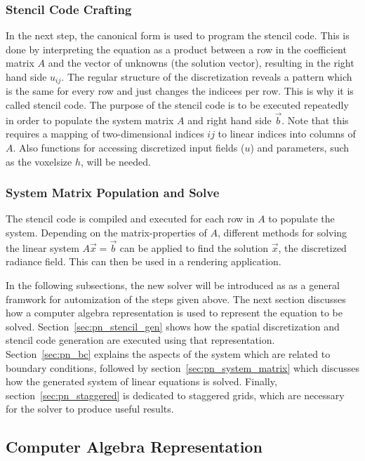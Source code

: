 \subsubsection*{Stencil Code Crafting}
In the next step, the canonical form is used to program the stencil code. This is done by interpreting the equation as a product between a row in the coefficient matrix $A$ and the vector of unknowns (the solution vector), resulting in the right hand side $u_{ij}$. The regular structure of the discretization reveals a pattern which is the same for every row and just changes the indicees per row. This is why it is called stencil code.
The purpose of the stencil code is to be executed repeatedly in order to populate the system matrix $A$ and right hand side $\vec{b}$. Note that this requires a mapping of two-dimensional indices $ij$ to linear indices into columns of $A$. Also functions for accessing discretized input fields ($u$) and parameters, such as the voxelsize $h$, will be needed.

\subsubsection*{System Matrix Population and Solve}
The stencil code is compiled and executed for each row in $A$ to populate the system. Depending on the matrix-properties of $A$, different methods for solving the linear system $A\vec{x}=\vec{b}$ can be applied to find the solution $\vec{x}$, the discretized radiance field. This can then be used in a rendering application.

In the following subsections, the new solver will be introduced as as a general framwork for automization of the steps given above. The next section discusses how a computer algebra representation is used to represent the equation to be solved. Section~\ref{sec:pn_stencil_gen} shows how the spatial discretization and stencil code generation are executed using that representation. Section~\ref{sec:pn_bc} explains the aspects of the system which are related to boundary conditions, followed by section~\ref{sec:pn_system_matrix} which discusses how the generated system of linear equations is solved. Finally, section~\ref{sec:pn_staggered} is dedicated to staggered grids, which are necessary for the solver to produce useful results.

\subsection{Computer Algebra Representation}
\label{sec:pn_car}

